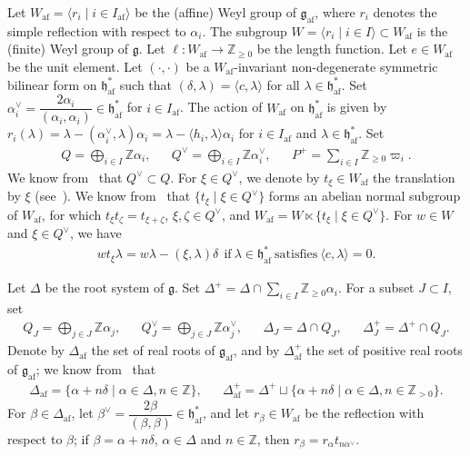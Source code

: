 \documentclass[10pt]{amsart}
\theoremstyle{definition}\newtheorem{defi}[theo]{Definition}
\theoremstyle{remark}\newtheorem{rema}[theo]{Remark}
\newcommand{\Fg}{\mathfrak{g}}
\newcommand{\Fh}{\mathfrak{h}}
\newcommand{\BZ}{\mathbb{Z}}
\DeclareMathOperator{\af}{af}
\begin{document}
Let 
$W_{\af} = \langle r_i \mid i \in I_{\af} \rangle$ 
be the (affine) Weyl group of $\Fg_{\af}$, 
where $r_i$ denotes the simple reflection with respect to $\alpha_i$.
The subgroup 
$W = \langle r_i \mid i \in I \rangle \subset W_{\af}$ 
is the (finite) Weyl group of $\Fg$. 
Let $\ell : W_{\af} \rightarrow \BZ_{\geq 0}$ be the length function. 
Let $e \in W_{\af}$ be the unit element. 
Let 
$(\cdot , \cdot)$
be a $W_{\af}$-invariant non-degenerate symmetric bilinear form on $\Fh_{\af}^*$ such that
$(\delta,\lambda) = \langle c,\lambda \rangle$ 
for all $\lambda \in \Fh_{\af}^*$. 
Set $\alpha_i^{\vee} = \dfrac{2 \alpha_i}{(\alpha_i , \alpha_i)} \in \Fh_{\af}^*$ for $i \in I_{\af}$.
The action of $W_{\af}$ on $\Fh_{\af}^*$ is given by
$r_i (\lambda) 
= 
\lambda - (\alpha_i^{\vee} , \lambda) \alpha_i
=
\lambda - \langle h_i , \lambda \rangle \alpha_i$ 
for $i \in I_{\af}$ and $\lambda \in \Fh_{\af}^*$.
Set
\begin{align}
Q
= 
\bigoplus_{i \in I} \BZ \alpha_i, &&
Q^{\vee} 
= 
\bigoplus_{i \in I} \BZ \alpha_i^{\vee}, &&
P^+ 
= 
\sum_{i \in I} \BZ_{\geq 0} \varpi_i.
\end{align}
We know from~\cite[\S~6.5]{Kac} that 
$Q^{\vee} \subset Q$. 
For $\xi \in Q^{\vee}$, 
we denote by 
$t_{\xi} \in W_{\af}$ 
the translation by $\xi$ (see~\cite[\S6.5]{Kac}).
We know from~\cite[Proposition~6.5]{Kac} 
that 
$\{ t_{\xi} \mid \xi \in Q^{\vee} \}$ 
forms an abelian normal subgroup of $W_{\af}$, 
for which 
$t_{\xi} t_{\zeta} = t_{\xi + \zeta}$, 
$\xi , \zeta \in Q^{\vee}$, 
and 
$W_{\af} = W \ltimes \{ t_{\xi} \mid \xi \in Q^{\vee} \}$. 
For $w \in W$ and $\xi \in Q^{\vee}$, we have 
\begin{align} \label{eq:lv0-act}
wt_{\xi}\lambda = w\lambda - ( \xi,\lambda ) \delta \ \ 
\text{if} \ 
\lambda \in \Fh_{\af}^* \ 
\text{satisfies} \ 
\langle c,\lambda \rangle = 0.
\end{align}

Let $\Delta$ be the root system of $\Fg$. 
Set $\Delta^+ = \Delta \cap \sum_{i \in I} \BZ_{\geq 0} \alpha_i$. 
For a subset $J \subset I$, set
\begin{align}
Q_J = \bigoplus_{j \in J} \BZ \alpha_j, && 
Q_J^{\vee} = \bigoplus_{j \in J} \BZ \alpha_j^{\vee}, && 
\Delta_J = \Delta \cap Q_J, && 
\Delta_J^+ = \Delta^+ \cap Q_J. 
\end{align}
Denote by $\Delta_{\af}$ the set of real roots of $\Fg_{\af}$, 
and by $\Delta_{\af}^+$ the set of positive real roots of $\Fg_{\af}$; 
we know from~\cite[Proposition~6.3]{Kac} that
\begin{align}
\Delta_{\af} 
= 
\{ \alpha + n\delta \mid \alpha \in \Delta , n \in \BZ \} , &&
\Delta_{\af}^+
= 
\Delta^+ 
\sqcup
\{ \alpha + n\delta \mid \alpha \in \Delta , n \in \BZ_{>0} \} .
\end{align}
For $\beta \in \Delta_{\af}$, 
let 
$\beta^{\vee} = \dfrac{2\beta}{(\beta,\beta)} \in \Fh_{\af}^*$, 
and let 
$r_{\beta} \in W_{\af}$ 
be the reflection with respect to $\beta$; 
if $\beta = \alpha + n\delta$, $\alpha \in \Delta$ and $n \in \BZ$, then
$r_{\beta} = r_{\alpha} t_{n\alpha^{\vee}}$.
\end{document}
